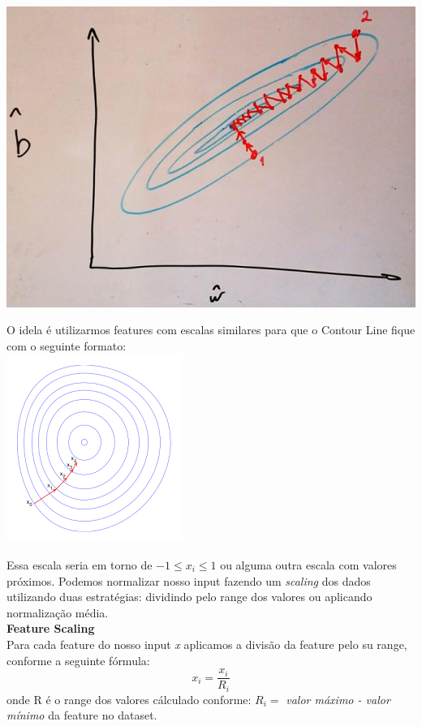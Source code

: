 \documentclass[11pt,a4paper,leqno]{article}
\begin{document}
\includegraphics[scale=0.3]{Images/gradiente_descendente_contour_ruim.jpeg} 

O idela é utilizarmos features com escalas similares para que o Contour Line fique com o seguinte formato:\\
\includegraphics[scale=0.5]{Images/gradiente_descendente_contour_ideal.png} 

Essa escala seria em torno de $-1 \leq x_i \leq 1$ ou alguma outra escala com valores próximos.
Podemos normalizar nosso input fazendo um \emph{scaling} dos dados utilizando duas estratégias: dividindo pelo range dos valores ou aplicando normalização média.
\\

\textbf{Feature Scaling}\\
Para cada feature do nosso input \emph{x} aplicamos a divisão da feature pelo su range, conforme a seguinte fórmula:
\[
x_i = \frac{x_i}{R_i}
\]
onde R é o range dos valores cálculado conforme: $R_i =$ \emph{valor máximo - valor mínimo} da feature no dataset.
\\
\end{document}
